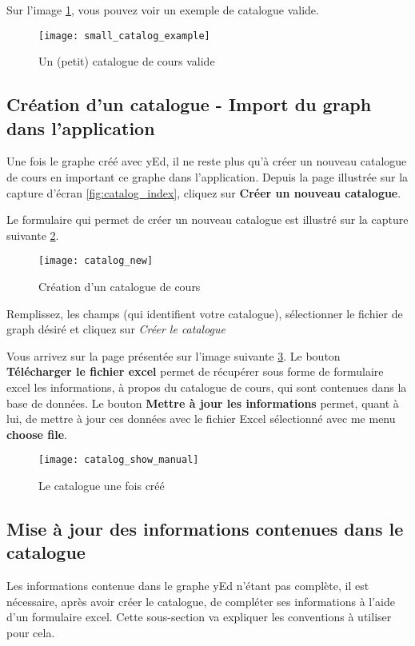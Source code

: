 Sur l'image \ref{fig:small_catalog_example}, vous pouvez voir un exemple de catalogue valide.

\begin{figure}
\centering
\texttt{[image: small\_catalog\_example]}
\label{fig:small_catalog_example}
\caption{Un (petit) catalogue de cours valide}

\end{figure}



\subsection{Création d'un catalogue - Import du graph dans l'application}
Une fois le graphe créé avec yEd, il ne reste plus qu'à créer un nouveau catalogue de cours en important ce graphe dans l'application. Depuis la page illustrée sur la capture d'écran \ref{fig:catalog_index}, cliquez sur \textbf{Créer un nouveau catalogue}.

Le formulaire qui permet de créer un nouveau catalogue est illustré sur la capture suivante \ref{fig:catalog_new}.

\begin{figure}
\centering
\caption{Création d'un catalogue de cours}
\label{fig:catalog_new}
\texttt{[image: catalog\_new]}
\end{figure}

Remplissez, les champs (qui identifient votre catalogue), sélectionner le fichier de graph désiré et cliquez sur \textit{Créer le catalogue}

Vous arrivez sur la page présentée sur l'image suivante \ref{fig:catalog_show_manual}. Le bouton \textbf{Télécharger le fichier excel} permet de récupérer sous forme de formulaire excel les informations, à propos du catalogue de cours, qui sont contenues dans la base de données. Le bouton \textbf{Mettre à jour les informations} permet, quant à lui, de mettre à jour ces données avec le fichier Excel sélectionné avec me menu \textbf{choose file}.

\begin{figure}
\centering
\caption{Le catalogue une fois créé}
\label{fig:catalog_show_manual}
\texttt{[image: catalog\_show\_manual]}
\end{figure}

\subsection{Mise à jour des informations contenues dans le catalogue}
Les informations contenue dans le graphe yEd n'étant pas complète, il est nécessaire, après avoir créer le catalogue, de compléter ses informations à l'aide d'un formulaire excel. Cette sous-section va expliquer les conventions à utiliser pour cela.

